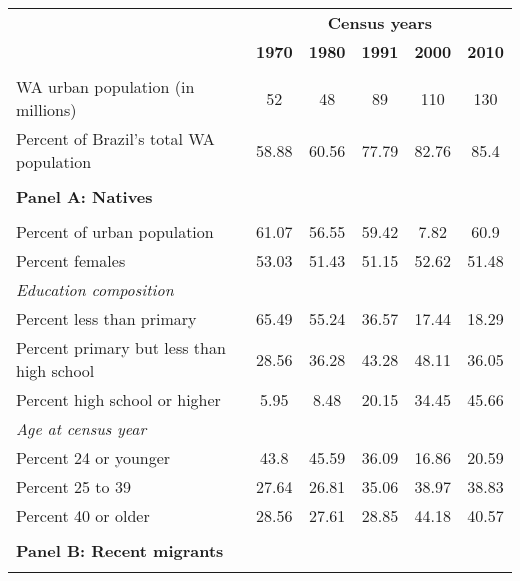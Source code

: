 \begin{tabular}{rccccc}
\toprule
      & \multicolumn{5}{c}{\textbf{Census years}} \\
      & \textbf{1970} & \textbf{1980} & \textbf{1991} & \textbf{2000} & \textbf{2010} \\
\cmidrule{2-6}      &       &       &       &       &  \\
\multicolumn{1}{l}{WA urban population (in millions)} & 52    & 48    & 89    & 110   & 130 \\
\multicolumn{1}{l}{    Percent of Brazil's total WA population} & 58.88 & 60.56 & 77.79 & 82.76 & 85.4 \\
      &       &       &       &       &  \\
\multicolumn{6}{l}{\textbf{Panel A: Natives}} \\
      &       &       &       &       &  \\
\multicolumn{1}{l}{    Percent of urban population} & 61.07 & 56.55 & 59.42 & 7.82  & 60.9 \\
\multicolumn{1}{l}{    Percent females} & 53.03 & 51.43 & 51.15 & 52.62 & 51.48 \\
\multicolumn{1}{l}{\textit{Education composition}} &       &       &       &       &  \\
\multicolumn{1}{l}{        Percent less than primary} & 65.49 & 55.24 & 36.57 & 17.44 & 18.29 \\
\multicolumn{1}{l}{        Percent primary but less than high school                                                } & 28.56 & 36.28 & 43.28 & 48.11 & 36.05 \\
\multicolumn{1}{l}{        Percent high school or higher} & 5.95  & 8.48  & 20.15 & 34.45 & 45.66 \\
\multicolumn{1}{l}{\textit{Age at census year}} &       &       &       &       &  \\
\multicolumn{1}{l}{        Percent 24 or younger} & 43.8  & 45.59 & 36.09 & 16.86 & 20.59 \\
\multicolumn{1}{l}{        Percent 25 to 39} & 27.64 & 26.81 & 35.06 & 38.97 & 38.83 \\
\multicolumn{1}{l}{        Percent 40 or older} & 28.56 & 27.61 & 28.85 & 44.18 & 40.57 \\
      &       &       &       &       &  \\
\multicolumn{6}{l}{\textbf{Panel B: Recent migrants}} \\
      &       &       &       &       &  \\

\end{tabular}
